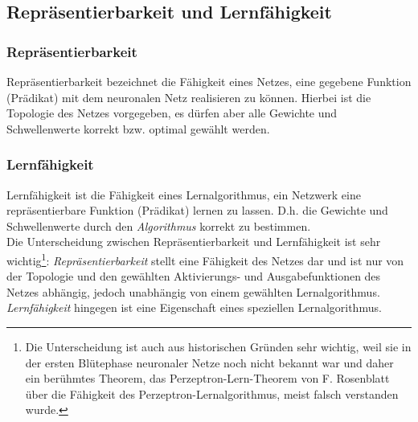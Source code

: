 \subsection*{Repräsentierbarkeit und Lernfähigkeit}

\subsubsection*{Repräsentierbarkeit} 
Repräsentierbarkeit bezeichnet die Fähigkeit eines Netzes, eine gegebene Funktion (Prädikat) mit dem neuronalen Netz realisieren zu können. Hierbei ist die Topologie des Netzes vorgegeben, es dürfen aber alle Gewichte und Schwellenwerte korrekt bzw. optimal gewählt werden.

\subsubsection*{Lernfähigkeit} 
Lernfähigkeit ist die Fähigkeit eines Lernalgorithmus, ein Netzwerk eine repräsentierbare Funktion (Prädikat) lernen zu lassen. D.h. die Gewichte und Schwellenwerte durch den \emph{Algorithmus} korrekt zu bestimmen. \\

Die Unterscheidung zwischen Repräsentierbarkeit und Lernfähigkeit ist sehr wichtig\footnote{Die Unterscheidung ist auch aus historischen Gründen sehr wichtig, weil sie in der ersten Blütephase neuronaler Netze noch nicht bekannt war und daher ein berühmtes Theorem, das Perzeptron-Lern-Theorem von F. Rosenblatt über die Fähigkeit des Perzeptron-Lernalgorithmus, meist falsch verstanden wurde.}:
\emph{Repräsentierbarkeit} stellt eine Fähigkeit des Netzes dar und ist nur von der Topologie und den gewählten Aktivierungs- und Ausgabefunktionen des Netzes abhängig, jedoch unabhängig von einem gewählten Lernalgorithmus.
\emph{Lernfähigkeit} hingegen ist eine Eigenschaft eines speziellen Lernalgorithmus. 



